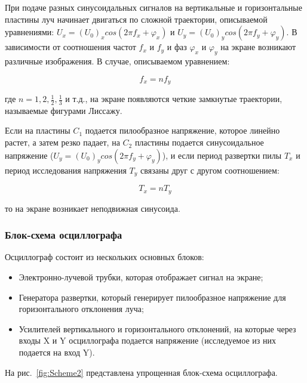 При подаче разных синусоидальных сигналов на вертикальные и горизонтальные пластины луч начинает двигаться по сложной траектории, описываемой уравнениями: $U_x = (U_0)_xcos(2{\pi}f_x + \varphi_x)$ и $U_y = (U_0)_ycos(2{\pi}f_y + \varphi_y)$. В зависимости от соотношения частот $f_x$ и $f_y$ и фаз $\varphi_x$ и $\varphi_y$ на экране возникают различные изображения. В случае, описываемом уравнением:

\begin{equation}
\label{eq:3}
   f_x = nf_y
\end{equation}

где $n = 1, 2, \frac{1}{2}, \frac{1}{3}$ и т.д., на экране появляются четкие замкнутые траектории, называемые фигурами Лиссажу.

Если на пластины $C_1$ подается пилообразное напряжение, которое линейно растет, а затем резко падает, на $C_2$ пластины подается синусоидальное напряжение ($U_y = (U_0)_ycos(2{\pi}f_y + \varphi_y)$), и если период развертки пилы $T_x$ и период исследования напряжения $T_y$ связаны друг с другом соотношением:

\begin{equation}
\label{eq:4}
   T_x = nT_y
\end{equation}

то на экране возникает неподвижная синусоида.

\subsubsection{Блок-схема осциллографа}

Осциллограф состоит из нескольких основных блоков:

\begin{itemize}
\item Электронно-лучевой трубки, которая отображает сигнал на экране;
\item Генератора развертки, который генерирует пилообразное напряжение для горизонтального отклонения луча;
\item Усилителей вертикального и горизонтального отклонений, на которые через входы X и Y осциллографа подается напряжение (исследуемое из них подается на вход Y).
\end{itemize}

На рис.~\ref{fig:Scheme2} представлена упрощенная блок-схема осциллографа.

